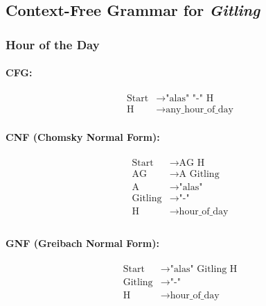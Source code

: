 \subsection{Context-Free Grammar for \textit{Gitling}}

\subsubsection{Hour of the Day}

\paragraph{CFG:}

\begin{equation*}
    \begin{aligned}
        \text{Start}   & \rightarrow \text{"alas" "-" H}   \\
        \text{H} & \rightarrow \text{any\_hour\_of\_day}   
        
    \end{aligned}
\end{equation*}

\paragraph{CNF (Chomsky Normal Form):}

\begin{equation*}
    \begin{aligned}
        \text{Start}   & \rightarrow \text{AG H} \\
        \text{AG}      & \rightarrow \text{A Gitling}\\
        \text{A}    & \rightarrow \text{"alas"}\\
        \text{Gitling} & \rightarrow \text{"-"}\\
        \text{H}   & \rightarrow \text{hour\_of\_day}\\
    \end{aligned}
\end{equation*}

\paragraph{GNF (Greibach Normal Form):}

\begin{equation*}
    \begin{aligned}
        \text{Start}   & \rightarrow \text{"alas" Gitling H}\\
        \text{Gitling} & \rightarrow \text{"-"}\\
        \text{H}   & \rightarrow \text{hour\_of\_day}\\
    \end{aligned}
\end{equation*}


